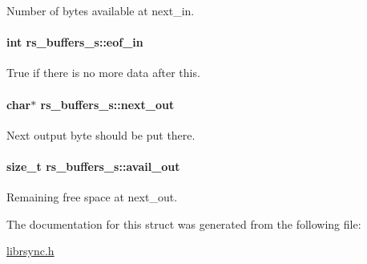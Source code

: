 Number of bytes available at next\_\-in. 

\hypertarget{structrs__buffers__s_a6783da2d894c77178155759cd12d16f}{
\paragraph[eof\_\-in]{\setlength{\rightskip}{0pt plus 5cm}int {\bf rs\_\-buffers\_\-s::eof\_\-in}}\hfill}
\label{structrs__buffers__s_a6783da2d894c77178155759cd12d16f}


True if there is no more data after this. 

\hypertarget{structrs__buffers__s_f3a6532c3e300a07783d61680cbdc11f}{
\paragraph[next\_\-out]{\setlength{\rightskip}{0pt plus 5cm}char$\ast$ {\bf rs\_\-buffers\_\-s::next\_\-out}}\hfill}
\label{structrs__buffers__s_f3a6532c3e300a07783d61680cbdc11f}


Next output byte should be put there. 

\hypertarget{structrs__buffers__s_e60f3db2f518d74aee13a02b7c9619a2}{
\paragraph[avail\_\-out]{\setlength{\rightskip}{0pt plus 5cm}size\_\-t {\bf rs\_\-buffers\_\-s::avail\_\-out}}\hfill}
\label{structrs__buffers__s_e60f3db2f518d74aee13a02b7c9619a2}


Remaining free space at next\_\-out. 



The documentation for this struct was generated from the following file:\begin{CompactItemize}
\item 
\hyperlink{librsync_8h}{librsync.h}\end{CompactItemize}

